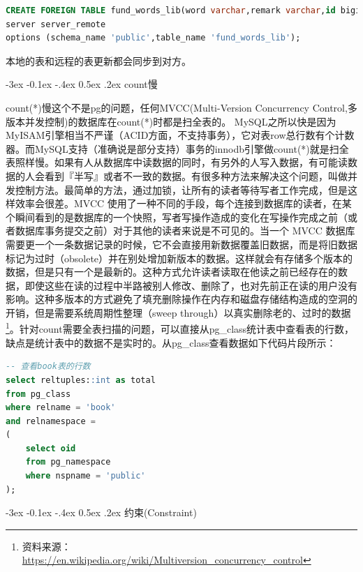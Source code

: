 \documentclass[8pt]{book}
\makeatletter
\numberwithin{dummy}{section}
\theoremstyle{ocrenumbox}
\theoremstyle{blacknumex}
\theoremstyle{blacknumbox}
\theoremstyle{ocrenum}
\renewcommand{\subsection}{\@startsection {subsection}{2}{\z@}
	{-3ex \@plus -0.1ex \@minus -.4ex}
	{0.5ex \@plus.2ex }
	{\normalfont\sffamily\bfseries}}
\newlength\esp
\makeatother
\begin{document}
\begin{lstlisting}[language=SQL]
CREATE FOREIGN TABLE fund_words_lib(word varchar,remark varchar,id bigint) 
server server_remote
options (schema_name 'public',table_name 'fund_words_lib');
\end{lstlisting}

本地的表和远程的表更新都会同步到对方。

\subsection{count慢}

count(*)慢这个不是pg的问题，任何MVCC(Multi-Version Concurrency Control,多版本并发控制)的数据库在count(*)时都是扫全表的。 MySQL之所以快是因为MyISAM引擎相当不严谨（ACID方面，不支持事务），它对表row总行数有个计数器。而MySQL支持（准确说是部分支持）事务的innodb引擎做count(*)就是扫全表照样慢。如果有人从数据库中读数据的同时，有另外的人写入数据，有可能读数据的人会看到『半写』或者不一致的数据。有很多种方法来解决这个问题，叫做并发控制方法。最简单的方法，通过加锁，让所有的读者等待写者工作完成，但是这样效率会很差。MVCC 使用了一种不同的手段，每个连接到数据库的读者，在某个瞬间看到的是数据库的一个快照，写者写操作造成的变化在写操作完成之前（或者数据库事务提交之前）对于其他的读者来说是不可见的。当一个 MVCC 数据库需要更一个一条数据记录的时候，它不会直接用新数据覆盖旧数据，而是将旧数据标记为过时（obsolete）并在别处增加新版本的数据。这样就会有存储多个版本的数据，但是只有一个是最新的。这种方式允许读者读取在他读之前已经存在的数据，即使这些在读的过程中半路被别人修改、删除了，也对先前正在读的用户没有影响。这种多版本的方式避免了填充删除操作在内存和磁盘存储结构造成的空洞的开销，但是需要系统周期性整理（sweep through）以真实删除老的、过时的数据\footnote{资料来源：\url{https://en.wikipedia.org/wiki/Multiversion_concurrency_control}}。针对count需要全表扫描的问题，可以直接从pg\_class统计表中查看表的行数，缺点是统计表中的数据不是实时的。从pg\_class查看数据如下代码片段所示：

\begin{lstlisting}[language=SQL]
-- 查看book表的行数
select reltuples::int as total 
from pg_class 
where relname = 'book' 
and relnamespace = 
(
	select oid 
	from pg_namespace 
	where nspname = 'public'
);
\end{lstlisting}

\subsection{约束(Constraint)}
\end{document}

